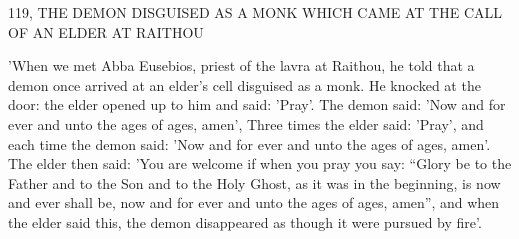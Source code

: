 119, THE DEMON DISGUISED AS A MONK WHICH
CAME AT THE CALL OF AN ELDER AT RAITHOU

'When we met Abba Eusebios, priest of the lavra at Raithou, he told
that a demon once arrived at an elder's cell disguised as a monk.
He
knocked at the door: the elder opened up to him and said: 'Pray'.
The demon said: 'Now and for ever and unto the ages of ages,
amen', Three times the elder said: 'Pray', and each time the demon
said: 'Now and for ever and unto the ages of ages, amen'.
The elder
then said: 'You are welcome if when you pray you say: “Glory be
to the Father and to the Son and to the Holy Ghost, as it was in
the beginning, is now and ever shall be, now and for ever and unto
the ages of ages, amen”, and when the elder said this, the demon
disappeared as though it were pursued by fire'.

